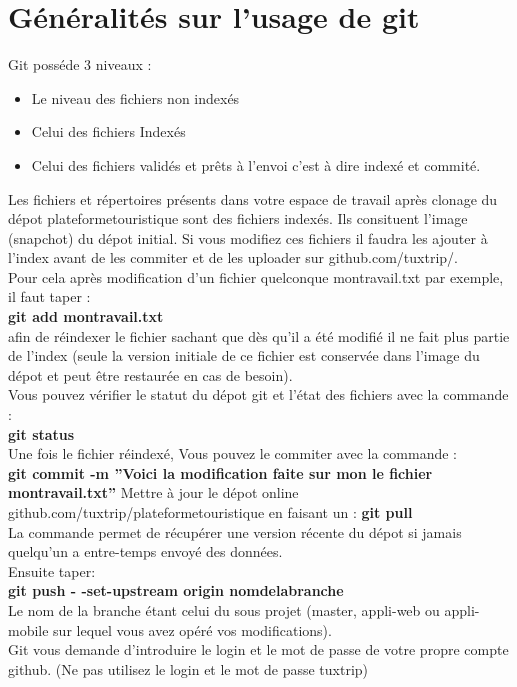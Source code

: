 \documentclass[a4paper, 12pt, openany]{report}
\begin{document}
\section*{Généralités sur l'usage de git}
Git posséde 3 niveaux : \\
\begin{itemize}
\item Le niveau des fichiers non indexés \\
\item Celui des fichiers Indexés \\
\item Celui des fichiers validés et prêts à l'envoi c'est à dire indexé et \og commité\fg{}.\\
\end{itemize}
Les fichiers et répertoires présents dans votre espace de travail après clonage du dépot \og plateformetouristique \fg{} sont des fichiers indexés. Ils consituent l'image (snapchot) du dépot initial. 
Si vous modifiez ces fichiers il faudra les ajouter à l'index avant de les commiter et de les uploader  sur github.com/tuxtrip/.\\
Pour cela après modification d'un fichier quelconque montravail.txt par exemple, il faut taper : \\
 \textbf{git add montravail.txt } \\
afin de réindexer le fichier sachant que dès qu'il a été modifié il ne fait plus partie de l'index (seule la version initiale de ce fichier est conservée dans l'image du dépot et peut être restaurée en cas de besoin). \\
Vous pouvez vérifier le statut du dépot git et l'état des fichiers avec la commande : \\
 \textbf{git status}\\
Une fois le fichier réindexé, Vous pouvez le commiter avec la commande : \\
 \textbf{git commit -m ''Voici la modification faite sur mon le fichier montravail.txt''}
Mettre à jour le dépot online github.com/tuxtrip/plateformetouristique en faisant un :
 \textbf{git pull}\\
La commande permet de récupérer une version récente du dépot si jamais quelqu'un a entre-temps envoyé des données.\\
Ensuite taper:\\
 \textbf{git push - -set-upstream origin nomdelabranche} \\
Le nom de la branche étant celui du sous projet (master, appli-web ou appli-mobile sur lequel vous avez opéré vos modifications). \\
Git vous demande d'introduire le login et le mot de passe de votre propre compte github. (Ne pas utilisez le login et le mot de passe tuxtrip)
\end{document}
